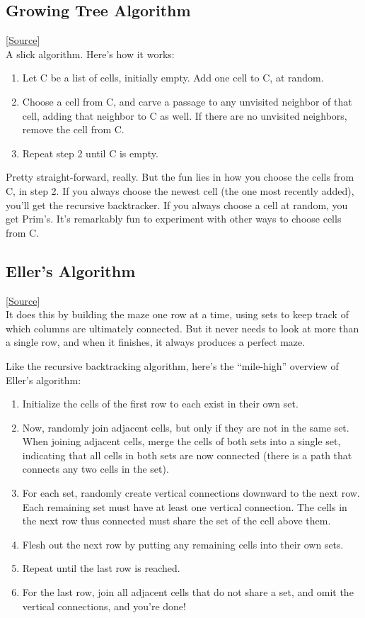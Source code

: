 \documentclass{article}
\begin{document}
\subsection*{Growing Tree Algorithm}
[\href{https://weblog.jamisbuck.org/2011/1/27/maze-generation-growing-tree-algorithm}{Source}]\\
A slick algorithm. Here's how it works:

\begin{enumerate}
    \item Let C be a list of cells, initially empty. Add one cell to C, at random.
    \item Choose a cell from C, and carve a passage to any unvisited neighbor of that cell, adding that neighbor to C as well. If there are no unvisited neighbors, remove the cell from C.
    \item Repeat step 2 until C is empty.
\end{enumerate}

Pretty straight-forward, really. But the fun lies in how you choose the cells from C, in step 2. If you always choose the newest cell (the one most recently added), you'll get the recursive backtracker. If you always choose a cell at random, you get Prim's. It's remarkably fun to experiment with other ways to choose cells from C.

\subsection*{Eller's Algorithm}
[\href{https://weblog.jamisbuck.org/2010/12/29/maze-generation-eller-s-algorithm}{Source}]\\
It does this by building the maze one row at a time, using sets to keep track of which columns are ultimately connected. But it never needs to look at more than a single row, and when it finishes, it always produces a perfect maze.

Like the recursive backtracking algorithm, here's the “mile-high” overview of Eller's algorithm:
\begin{enumerate}
    \item Initialize the cells of the first row to each exist in their own set.
    \item Now, randomly join adjacent cells, but only if they are not in the same set. When joining adjacent cells, merge the cells of both sets into a single set, indicating that all cells in both sets are now connected (there is a path that connects any two cells in the set).
    \item For each set, randomly create vertical connections downward to the next row. Each remaining set must have at least one vertical connection. The cells in the next row thus connected must share the set of the cell above them.
    \item Flesh out the next row by putting any remaining cells into their own sets.
    \item Repeat until the last row is reached.
    \item For the last row, join all adjacent cells that do not share a set, and omit the vertical connections, and you're done!

\end{enumerate}
\end{document}
